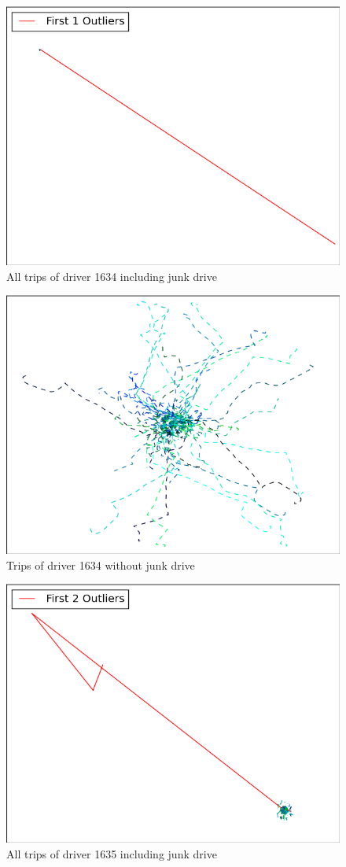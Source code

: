\documentclass{vldb}
\begin{document}
\begin{figure}
\centering
\includegraphics[width=0.8\linewidth]{"pics/outliers_junk/D_1634_with_136"}
\caption{All trips of driver 1634 including junk drive}
\label{fig:d-1634-junk}
\end{figure}

\begin{figure}
\centering
\includegraphics[width=0.8\linewidth]{"pics/outliers_junk/D_1634_wo_136"}
\caption{Trips of driver 1634 without junk drive}
\label{fig:d-1634}
\end{figure}

\begin{figure}
\centering
\includegraphics[width=0.8\linewidth]{"pics/outliers_junk/D_1635_unclean"}
\caption{All trips of driver 1635 including junk drive}
\label{fig:d-1635-junk}
\end{figure}
\end{document}
